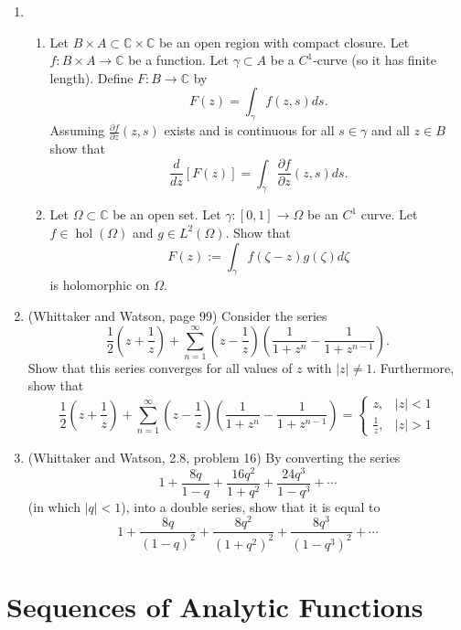 \documentclass[a4paper,10pt]{article}
\newcommand{\CC}{\mathbb{C}}
\newcommand{\hol}{\operatorname{hol}}
\begin{document}
\begin{enumerate}
\item 
\begin{enumerate}
\item 
Let $B\times A \subset \CC \times \CC$ be an open region with compact closure.
Let $f: B\times A \to \CC$ be a function.  Let $\gamma \subset A$ be a $C^1$-curve (so it has finite length). 
Define $F: B \to \CC$ by  
 $$ F(z) = \int_{\gamma} f(z,s) ds.$$
Assuming $\frac{\partial f}{\partial z}(z,s)$ exists and is continuous for all $s \in \gamma$ and all $z \in B$ show that 
 $$ \frac{d}{dz}[ F(z)] = \int_{\gamma} \frac{\partial f}{\partial z}(z,s) ds. $$
\item Let $\Omega \subset \CC$ be an open set. Let $\gamma:[0,1]\to \Omega$ be an $C^1$ curve. 
Let $f \in \hol(\Omega)$ and $g \in L^2(\Omega)$. Show that 
 $$ F(z) := \int_{\gamma} f(\zeta-z)g(\zeta)d \zeta $$ 
is holomorphic on $\Omega$.
\end{enumerate}


\item (Whittaker and Watson, page 99)
Consider the series 
 $$ \frac{1}{2} \left( z + \frac{1}{z} \right) + \sum_{n=1}^\infty \left( z - \frac{1}{z} \right) \left( \frac{1}{1+z^n} - \frac{1}{1+z^{n-1}} \right). $$
Show that this series converges for all values of $z$ with $\vert z \vert \neq 1$. 
Furthermore, show that 
$$ \frac{1}{2} \left( z + \frac{1}{z} \right) + \sum_{n=1}^\infty \left( z - \frac{1}{z} \right) \left( \frac{1}{1+z^n} - \frac{1}{1+z^{n-1}} \right) = \begin{cases}
z, & \vert z \vert <1 \\
\frac{1}{z}, & \vert z \vert > 1
\end{cases}$$

\item (Whittaker and Watson, 2.8, problem 16)
By converting the series 
 $$1 + \frac{8q}{1-q} + \frac{16q^2}{1+q^2} + \frac{24q^3}{1-q^3} + \cdots $$ 
(in which $\vert q \vert<1$), into a double series, show that it is equal to 
 $$ 1 + \frac{8q}{(1-q)^2}+ \frac{8q^2}{(1+q^2)^2} + \frac{8q^3}{(1-q^3)^2} + \cdots $$
\end{enumerate}



\newpage 
\section{Sequences of Analytic Functions}
\end{document}
